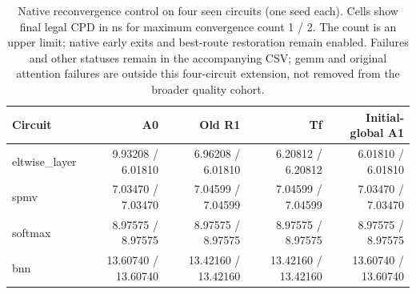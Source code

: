 \begin{table}[t]
\centering\scriptsize
\caption{Native reconvergence control on four seen circuits (one seed each). Cells show final legal CPD in ns for maximum convergence count 1 / 2. The count is an upper limit; native early exits and best-route restoration remain enabled. Failures and other statuses remain in the accompanying CSV; gemm and original attention failures are outside this four-circuit extension, not removed from the broader quality cohort.}
\label{tab:native-reconvergence}
\begin{tabular}{lrrrr}
\hline
Circuit & A0 & Old R1 & Tf & Initial-global A1 \\
\hline
eltwise\_layer & 9.93208 / 6.01810 & 6.96208 / 6.01810 & 6.20812 / 6.20812 & 6.01810 / 6.01810 \\
spmv & 7.03470 / 7.03470 & 7.04599 / 7.04599 & 7.04599 / 7.04599 & 7.03470 / 7.03470 \\
softmax & 8.97575 / 8.97575 & 8.97575 / 8.97575 & 8.97575 / 8.97575 & 8.97575 / 8.97575 \\
bnn & 13.60740 / 13.60740 & 13.42160 / 13.42160 & 13.42160 / 13.42160 & 13.60740 / 13.60740 \\
\hline
\end{tabular}
\end{table}

